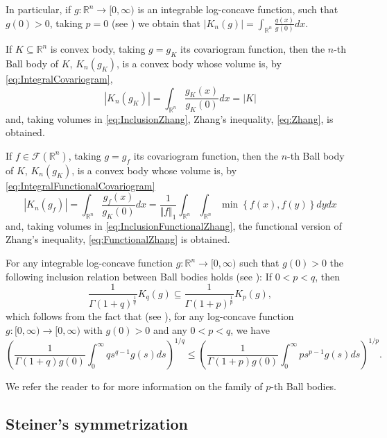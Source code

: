 \documentclass{amsart}
\newcommand{\R}{\mathbb R}
\theoremstyle{remark}
\theoremstyle{definition}
\numberwithin{equation}{section}
\begin{document}
In particular, if $g:\R^n\to[0,\infty)$ is an integrable log-concave function, such that $g(0)>0$, taking $p=0$ (see \cite[Lem. 2.5.6]{BGVV}) we obtain that  $\displaystyle{|K_n(g)|=\int_{\R^n}\frac{g(x)}{g(0)}dx}$.

If $K\subseteq\R^n$ is convex body, taking $g=g_K$ its covariogram function, then the $n$-th Ball body of $K$, $K_n(g_K)$, is a convex body whose volume is, by \eqref{eq:IntegralCovariogram},
$$
|K_n(g_K)|=\int_{\R^n}\frac{g_K(x)}{g_K(0)}dx=|K|
$$
and, taking volumes in \eqref{eq:InclusionZhang}, Zhang's inequality, \eqref{eq:Zhang}, is obtained.

If $f\in\mathcal{F}(\R^n)$, taking $g=g_f$ its covariogram function, then the $n$-th Ball body of $K$, $K_n(g_K)$, is a convex body whose volume is, by \eqref{eq:IntegralFunctionalCovariogram}
$$
|K_n(g_f)|=\int_{\R^n}\frac{g_f(x)}{g_K(0)}dx=\frac{1}{\Vert f\Vert_1}\int_{\R^n}\int_{\R^n}\min\left\{f(x),f(y)\right\}dydx
$$
and, taking volumes in \eqref{eq:InclusionFunctionalZhang}, the functional version of Zhang's inequality, \eqref{eq:FunctionalZhang} is obtained.

For any integrable log-concave function $g:\R^n\to[0,\infty)$ such that $g(0)>0$ the following inclusion relation between Ball bodies holds (see \cite[Prop. 2.5.7]{BGVV}): If $0<p<q$, then
$$
\frac{1}{\Gamma (1+q)^\frac{1}{q}} K_q (g) \subseteq  \frac{1}{\Gamma (1+p)^\frac{1}{p}}K_p (g),
$$
which follows from the fact that (see \cite[Thm.2.2.3]{BGVV}), for any log-concave function $g:[0,\infty)\to[0,\infty)$ with $g(0)>0$  and any $0<p<q$, we have
\begin{equation}\label{eq:InequalityInclusionBallsBodies}
\left( \frac{1}{\Gamma(1+q) g(0)}  \int_0^{\infty}qs^{q-1}g(s) ds \right)^{1/q} \leq \left( \frac{1}{\Gamma(1+p) g(0) }  \int_0^{\infty} ps^{p-1}g(s) ds \right)^{1/p}.
\end{equation}

We refer the reader to \cite[Sect. 2.5]{BGVV} for more information on the family of $p$-th Ball bodies.

\subsection{Steiner's symmetrization}\label{sec:Steiner}
\end{document}
